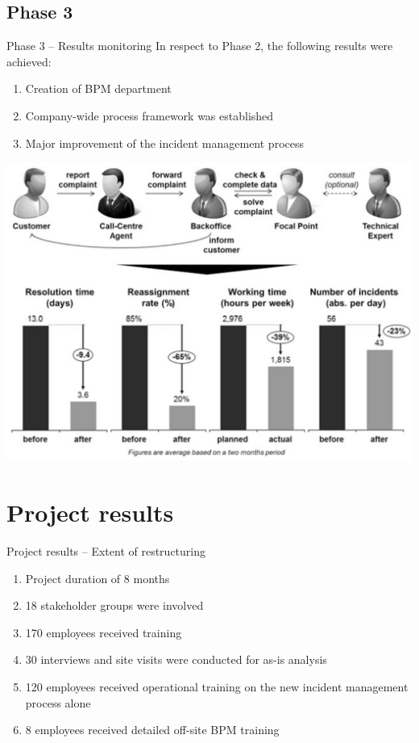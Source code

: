 \documentclass{beamer}
\begin{document}
\subsection{Phase 3}
\begin{frame}{Phase 3 -- Results monitoring}
    In respect to Phase 2, the following results were achieved:
    \begin{enumerate}
        \item Creation of BPM department
        \item Company-wide process framework was established
        \item Major improvement of the incident management process
    \end{enumerate}
\end{frame}

\begin{frame}
    \begin{center}
        \includegraphics[width=1.0\textwidth]{proj_phase3results.png}
    \end{center}
\end{frame}

\section{Project results}
\begin{frame}{Project results -- Extent of restructuring}
    \begin{enumerate}[$\circ$]
        \item Project duration of 8 months
        \item 18 stakeholder groups were involved
        \item 170 employees received training
        \item 30 interviews and site visits were conducted for as-is analysis
        \item 120 employees received operational training on the new incident management process alone
        \item 8 employees received detailed off-site BPM training
    \end{enumerate}
\end{frame}
\end{document}
